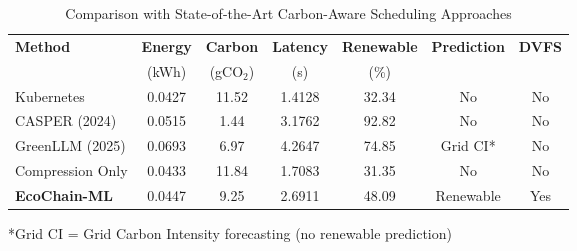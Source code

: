 
\begin{table}[t]
\centering
\caption{Comparison with State-of-the-Art Carbon-Aware Scheduling Approaches}
\label{tab:sota_comparison}
\small
\begin{tabular}{lcccccc}
\hline
\textbf{Method} & \textbf{Energy} & \textbf{Carbon} & \textbf{Latency} & \textbf{Renewable} & \textbf{Prediction} & \textbf{DVFS} \\
 & (kWh) & (gCO$_2$) & (s) & (\%) & & \\
\hline
Kubernetes & 0.0427 & 11.52 & 1.4128 & 32.34 & No & No \\
CASPER (2024) & 0.0515 & 1.44 & 3.1762 & 92.82 & No & No \\
GreenLLM (2025) & 0.0693 & 6.97 & 4.2647 & 74.85 & Grid CI* & No \\
Compression Only & 0.0433 & 11.84 & 1.7083 & 31.35 & No & No \\
\textbf{EcoChain-ML} & 0.0447 & 9.25 & 2.6911 & 48.09 & Renewable & Yes \\

\hline
\end{tabular}
\vspace{2mm}
\footnotesize{*Grid CI = Grid Carbon Intensity forecasting (no renewable prediction)}
\end{table}
